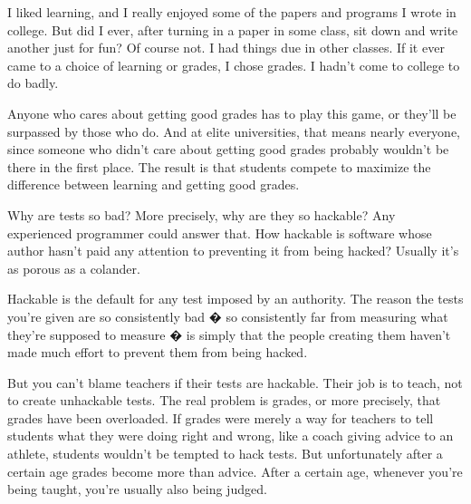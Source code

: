 I liked
                  learning, and I really enjoyed some of the papers and programs
                  I wrote in college. But did I ever, after turning in a paper
                  in some class, sit down and write another just for fun? Of
                  course not. I had things due in other classes. If it ever came
                  to a choice of learning or grades, I chose grades. I hadn't
                  come to college to do badly.

Anyone who cares about
                  getting good grades has to play this game, or they'll be
                  surpassed by those who do. And at elite universities, that
                  means nearly everyone, since someone who didn't care about
                  getting good grades probably wouldn't be there in the first
                  place. The result is that students compete to maximize the
                  difference between learning and getting good grades.

Why
                  are tests so bad? More precisely, why are they so hackable?
                  Any experienced programmer could answer that. How hackable is
                  software whose author hasn't paid any attention to preventing
                  it from being hacked? Usually it's as porous as a colander.

Hackable
                  is the default for any test imposed by an authority. The
                  reason the tests you're given are so consistently bad � so
                  consistently far from measuring what they're supposed to
                  measure � is simply that the people creating them haven't made
                  much effort to prevent them from being hacked.

But
                  you can't blame teachers if their tests are hackable. Their
                  job is to teach, not to create unhackable tests. The real
                  problem is grades, or more precisely, that grades have been
                  overloaded. If grades were merely a way for teachers to tell
                  students what they were doing right and wrong, like a coach
                  giving advice to an athlete, students wouldn't be tempted to
                  hack tests. But unfortunately after a certain age grades
                  become more than advice. After a certain age, whenever you're
                  being taught, you're usually also being judged.

